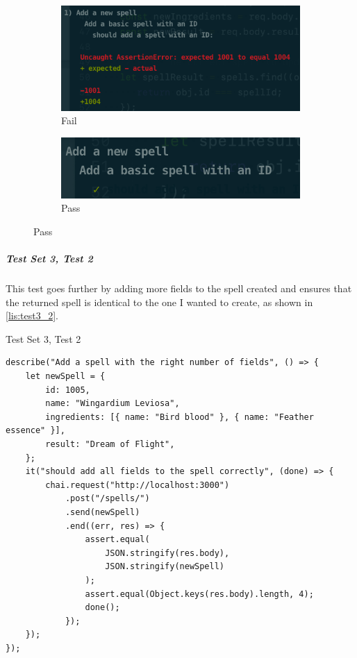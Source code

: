 \begin{figure}[h]
\caption{Test output for test set 3, test 1}
\label{fig:test3_1}
	\centering
	\begin{subfigure}[b]{0.5\textwidth}
		\centering
		\includegraphics[width=\textwidth]{images/31_fail}
		\caption{Fail}
		\label{fig:test31_fail}
	\end{subfigure}
	\hfill
	\begin{subfigure}[b]{0.5\textwidth}
		\centering
		\includegraphics[width=\textwidth]{images/31_pass}
		\caption{Pass}
		\label{fig:test31_pass}
	\end{subfigure}
\end{figure}

\subparagraph{Test Set 3, Test 2} This test goes further by adding more fields to the spell created and ensures that the returned spell is identical to the one I wanted to create, as shown in \autoref{lis:test3_2}.

\begin{listing}[h]
\caption{Test Set 3, Test 2}
\label{lis:test3_2}
\begin{verbatim}
describe("Add a spell with the right number of fields", () => {
	let newSpell = {
		id: 1005,
		name: "Wingardium Leviosa",
		ingredients: [{ name: "Bird blood" }, { name: "Feather essence" }],
		result: "Dream of Flight",
	};
	it("should add all fields to the spell correctly", (done) => {
		chai.request("http://localhost:3000")
			.post("/spells/")
			.send(newSpell)
			.end((err, res) => {
				assert.equal(
					JSON.stringify(res.body),
					JSON.stringify(newSpell)
				);
				assert.equal(Object.keys(res.body).length, 4);
				done();
			});
	});
});
\end{verbatim}
\end{listing}

